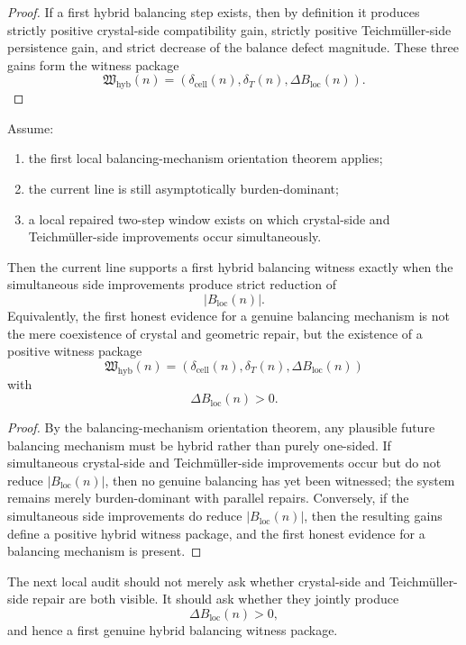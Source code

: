 \begin{proof}
If a first hybrid balancing step exists, then by definition it produces strictly positive crystal-side compatibility gain, strictly positive Teichm\"uller-side persistence gain, and strict decrease of the balance defect magnitude.
These three gains form the witness package
\[
  \mathfrak W_{\mathrm{hyb}}(n)
  =
  (\delta_{\mathrm{cell}}(n),\delta_{T}(n),\Delta B_{\mathrm{loc}}(n)).
\]
\end{proof}

\begin{theorem}
\label{thm:first-hybrid-balancing-witness-theorem}
Assume:
\begin{enumerate}[leftmargin=2em,label=(\alph*)]
  \item the first local balancing-mechanism orientation theorem applies;
  \item the current line is still asymptotically burden-dominant;
  \item a local repaired two-step window exists on which crystal-side and Teichm\"uller-side improvements occur simultaneously.
\end{enumerate}
Then the current line supports a first hybrid balancing witness exactly when the simultaneous side improvements produce strict reduction of
\[
  |B_{\mathrm{loc}}(n)|.
\]
Equivalently, the first honest evidence for a genuine balancing mechanism is not the mere coexistence of crystal and geometric repair, but the existence of a positive witness package
\[
  \mathfrak W_{\mathrm{hyb}}(n)
  =
  (\delta_{\mathrm{cell}}(n),\delta_{T}(n),\Delta B_{\mathrm{loc}}(n))
\]
with
\[
  \Delta B_{\mathrm{loc}}(n)>0.
\]
\end{theorem}

\begin{proof}
By the balancing-mechanism orientation theorem, any plausible future balancing mechanism must be hybrid rather than purely one-sided.
If simultaneous crystal-side and Teichm\"uller-side improvements occur but do not reduce \(|B_{\mathrm{loc}}(n)|\), then no genuine balancing has yet been witnessed; the system remains merely burden-dominant with parallel repairs.
Conversely, if the simultaneous side improvements do reduce \(|B_{\mathrm{loc}}(n)|\), then the resulting gains define a positive hybrid witness package, and the first honest evidence for a balancing mechanism is present.
\end{proof}

\begin{corollary}
\label{cor:current-hybrid-balancing-working-rule}
The next local audit should not merely ask whether crystal-side and Teichm\"uller-side repair are both visible.
It should ask whether they jointly produce
\[
  \Delta B_{\mathrm{loc}}(n)>0,
\]
and hence a first genuine hybrid balancing witness package.
\end{corollary}


